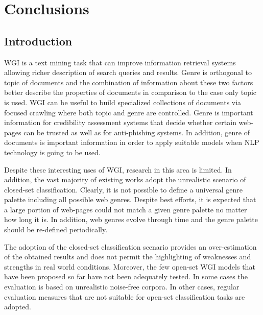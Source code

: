 
\chapter{Conclusions}

\label{chap:conclusions}


\newcommand{\keyword}[1]{\textbf{#1}}
\newcommand{\tabhead}[1]{\textbf{#1}}
\newcommand{\code}[1]{\texttt{#1}}
\newcommand{\file}[1]{\texttt{\bfseries#1}}
\newcommand{\option}[1]{\texttt{\itshape#1}}


\section{Introduction}

WGI is a text mining task that can improve information retrieval systems allowing richer description of search queries and results. Genre is orthogonal to topic of documents and the combination of information about these two factors better describe the properties of documents in comparison to the case only topic is used. WGI can be useful to build specialized collections of documents via focused crawling where both topic and genre are controlled. Genre is important information for credibility assessment systems that decide whether certain web-pages can be trusted as well as for anti-phishing systems. In addition, genre of documents is important information in order to apply suitable models when NLP technology is going to be used.

Despite these interesting uses of WGI, research in this area is limited. In addition, the vast majority of existing works adopt the unrealistic scenario of closed-set classification. Clearly, it is not possible to define a universal genre palette including all possible web genres. Despite best efforts, it is expected that a large portion of web-pages could not match a given genre palette no matter how long it is. In addition, web genres evolve through time and the genre palette should be re-defined periodically.

The adoption of the closed-set classification scenario provides an over-estimation of the obtained results and does not permit the highlighting of weaknesses and strengths in real world conditions. Moreover, the few open-set WGI models that have been proposed so far have not been adequately tested. In some cases the evaluation is based on unrealistic noise-free corpora. In other cases, regular evaluation measures that are not suitable for open-set classification tasks are adopted. 

